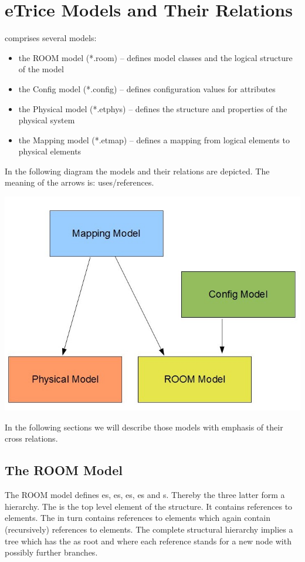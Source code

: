 \section{eTrice{} Models and Their Relations}

\eTrice{} comprises several models:

\begin{itemize}
\item the ROOM model (*.room) -- defines model classes and the logical structure of the model
\item the Config model (*.config) -- defines configuration values for attributes
\item the Physical model (*.etphys) -- defines the structure and properties of the physical system
\item the Mapping model (*.etmap) -- defines a mapping from logical elements to physical elements
\end{itemize}

In the following diagram the models and their relations are depicted. The meaning of the arrows is: 
uses/references.

\includegraphics[scale=0.4]{images/080-models.jpg}

In the following sections we will describe those models with emphasis of their cross relations.

\subsection{The ROOM Model}

The ROOM model defines es, es, es, es and s.
Thereby the three latter form a hierarchy. The  is the top level element of the structure. 
It contains references to  elements. The  in turn contains 
references to  elements which again contain (recursively) references to 
 elements. The complete structural hierarchy implies a tree which has the 
 as root and where each reference stands for a new node with possibly further 
branches.

